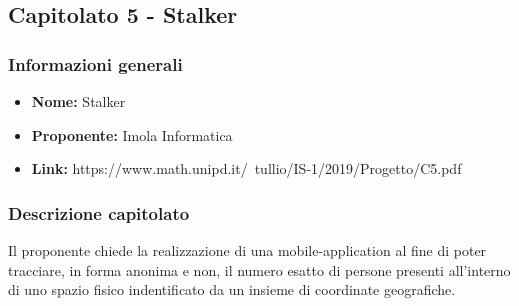 \subsection{Capitolato 5 - Stalker}

	\subsubsection{Informazioni generali}
		\begin{itemize}
			\item \textbf{Nome:} Stalker
			\item \textbf{Proponente:} Imola Informatica
			\item \textbf{Link:} https://www.math.unipd.it/~tullio/IS-1/2019/Progetto/C5.pdf
		\end{itemize}

	\subsubsection{Descrizione capitolato}
		Il proponente chiede la realizzazione di una mobile-application al fine di poter tracciare, in forma anonima e non, il numero esatto di persone presenti all'interno di uno spazio fisico indentificato da un insieme di coordinate geografiche.


